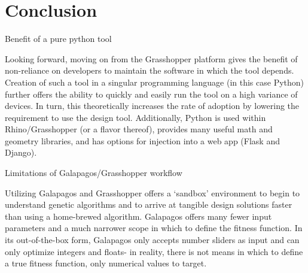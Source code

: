 \chapter{Conclusion}
\label{chap:conclusion}

Benefit of a pure python tool

Looking forward, moving on from the Grasshopper platform gives the benefit of non-reliance on developers to maintain the software in which the tool depends. Creation of such a tool in a singular programming language (in this case Python) further offers the ability to quickly and easily run the tool on a high variance of devices. In turn, this theoretically increases the rate of adoption by lowering the requirement to use the design tool. Additionally, Python is used within Rhino/Grasshopper (or a flavor thereof), provides many useful math and geometry libraries, and has options for injection into a web app (Flask and Django).

Limitations of Galapagos/Grasshopper workflow

Utilizing Galapagos and Grasshopper offers a ‘sandbox’ environment to begin to understand genetic algorithms and to arrive at tangible design solutions faster than using a home-brewed algorithm. Galapagos offers many fewer input parameters and a much narrower scope in which to define the fitness function. In its out-of-the-box form, Galapagos only accepts number sliders as input and can only optimize integers and floats- in reality, there is not means in which to define a true fitness function, only numerical values to target. 
